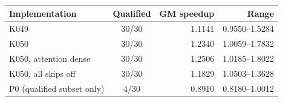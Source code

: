 \begin{tabular}{@{}lcrr@{}}
\toprule
Implementation & Qualified & GM speedup & Range \\
\midrule
K049 & 30/30 & 1.1141 & 0.9550--1.5284 \\
K050 & 30/30 & 1.2340 & 1.0059--1.7832 \\
K050, attention dense & 30/30 & 1.2506 & 1.0185--1.8022 \\
K050, all skips off & 30/30 & 1.1829 & 1.0503--1.3628 \\
P0 (qualified subset only) & 4/30 & 0.8910 & 0.8180--1.0012 \\
\bottomrule
\end{tabular}

